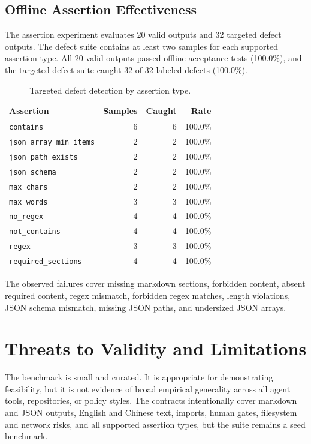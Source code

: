 \documentclass[10pt,conference]{IEEEtran}
\begin{document}
\subsection{Offline Assertion Effectiveness}

The assertion experiment evaluates 20 valid outputs and 32 targeted defect outputs.
The defect suite contains at least two samples for each supported assertion type.
All 20 valid outputs passed offline acceptance tests (100.0\%), and the targeted
defect suite caught 32 of 32 labeled defects (100.0\%).

\begin{table}[t]
\caption{Targeted defect detection by assertion type.}
\label{tab:assertions}
\centering
\begin{tabular}{lrrr}
\toprule
Assertion & Samples & Caught & Rate \\
\midrule
\texttt{contains} & 6 & 6 & 100.0\% \\
\texttt{json\_array\_min\_items} & 2 & 2 & 100.0\% \\
\texttt{json\_path\_exists} & 2 & 2 & 100.0\% \\
\texttt{json\_schema} & 2 & 2 & 100.0\% \\
\texttt{max\_chars} & 2 & 2 & 100.0\% \\
\texttt{max\_words} & 3 & 3 & 100.0\% \\
\texttt{no\_regex} & 4 & 4 & 100.0\% \\
\texttt{not\_contains} & 4 & 4 & 100.0\% \\
\texttt{regex} & 3 & 3 & 100.0\% \\
\texttt{required\_sections} & 4 & 4 & 100.0\% \\
\bottomrule
\end{tabular}
\end{table}

The observed failures cover missing markdown sections, forbidden content, absent
required content, regex mismatch, forbidden regex matches, length violations, JSON
schema mismatch, missing JSON paths, and undersized JSON arrays.

\section{Threats to Validity and Limitations}

The benchmark is small and curated. It is appropriate for demonstrating feasibility,
but it is not evidence of broad empirical generality across all agent tools,
repositories, or policy styles. The contracts intentionally cover markdown and JSON
outputs, English and Chinese text, imports, human gates, filesystem and network
risks, and all supported assertion types, but the suite remains a seed benchmark.
\end{document}
